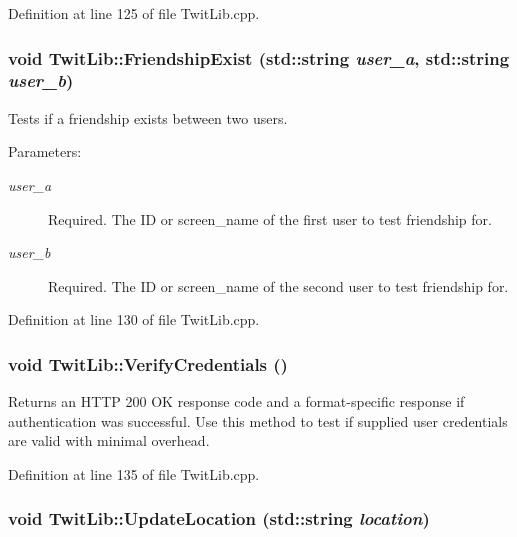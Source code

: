 Definition at line 125 of file TwitLib.cpp.\hypertarget{classTwitLib_31f1bc4db7624b5e9a6eeffc648778c5}{
\subsubsection{\setlength{\rightskip}{0pt plus 5cm}void TwitLib::FriendshipExist (std::string {\em user\_\-a}, \/  std::string {\em user\_\-b})}}
\label{classTwitLib_31f1bc4db7624b5e9a6eeffc648778c5}


Tests if a friendship exists between two users. \begin{Desc}
\item[Parameters:]
\begin{description}
\item[{\em user\_\-a}]Required. The ID or screen\_\-name of the first user to test friendship for. \item[{\em user\_\-b}]Required. The ID or screen\_\-name of the second user to test friendship for. \end{description}
\end{Desc}


Definition at line 130 of file TwitLib.cpp.\hypertarget{classTwitLib_50ebe7525d2f6acb9ecd9a9217265c79}{
\subsubsection{\setlength{\rightskip}{0pt plus 5cm}void TwitLib::VerifyCredentials ()}}
\label{classTwitLib_50ebe7525d2f6acb9ecd9a9217265c79}


Returns an HTTP 200 OK response code and a format-specific response if authentication was successful. Use this method to test if supplied user credentials are valid with minimal overhead. 

Definition at line 135 of file TwitLib.cpp.\hypertarget{classTwitLib_b133510fb4b88bd568a404e8271c7df4}{
\subsubsection{\setlength{\rightskip}{0pt plus 5cm}void TwitLib::UpdateLocation (std::string {\em location})}}
\label{classTwitLib_b133510fb4b88bd568a404e8271c7df4}


